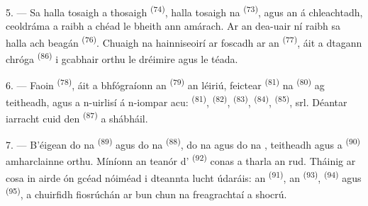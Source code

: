 \VUsaut{5.0mm}
\VUsaut{3.4mm}

5. --- Sa halla tosaigh a thosaigh  \textsuperscript{(74)}, halla
tosaigh na  \textsuperscript{(73)}, agus an  á
chleachtadh, ceoldráma a raibh a chéad  le bheith ann amárach. Ar an
dea-uair ní raibh sa halla ach beagán  \textsuperscript{(76)}.
Chuaigh na hainniseoirí ar foscadh ar an  \textsuperscript{(77)}, áit
a dtagann  chróga \textsuperscript{(86)} i gcabhair orthu le
dréimire agus le téada.

6. --- Faoin  \textsuperscript{(78)}, áit a bhfógraíonn an
 \textsuperscript{(79)} an léiriú, feictear 
\textsuperscript{(81)} na  \textsuperscript{(80)} ag teitheadh,
agus a n-uirlisí á n-iompar acu:  \textsuperscript{(81)},
 \textsuperscript{(82)},  \textsuperscript{(83)},
 \textsuperscript{(84)},  \textsuperscript{(85)}, srl.
Déantar iarracht cuid den  \textsuperscript{(87)} a shábháil.

7. --- B'éigean do na  \textsuperscript{(89)} agus do na
 \textsuperscript{(88)}, do na  agus do na
, teitheadh agus a 
\textsuperscript{(90)} amharclainne orthu. Míníonn an teanór d'
\textsuperscript{(92)} conas a tharla an rud. Tháinig  ar
cosa in airde ón gcéad nóiméad i dteannta lucht údaráis: an 
\textsuperscript{(91)}, an  \textsuperscript{(93)},  \textsuperscript{(94)} agus 
\textsuperscript{(95)}, a chuirfidh fiosrúchán ar bun chun na freagrachtaí a
shocrú.
